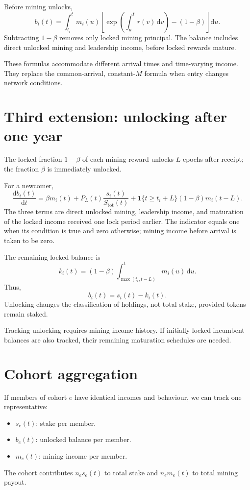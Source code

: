 \documentclass[11pt,a4paper]{article}
\newcommand{\ind}{\mathbf{1}}
\newcommand{\rmd}{\mathrm{d}}
\begin{document}
Before mining unlocks,
\begin{equation}
\boxed{b_i(t)=\int_{t_i}^{t}m_i(u)\left[\exp\!\left(\int_u^t r(v)\,\rmd v\right)-(1-\beta)\right]\rmd u.}
\end{equation}
Subtracting $1-\beta$ removes only locked mining principal. The balance includes direct unlocked mining and leadership income, before locked rewards mature.

These formulas accommodate different arrival times and time-varying income. They replace the common-arrival, constant-$M$ formula when entry changes network conditions.

\section{Third extension: unlocking after one year}
The locked fraction $1-\beta$ of each mining reward unlocks $L$ epochs after receipt; the fraction $\beta$ is immediately unlocked.

For a newcomer,
\begin{equation}
\boxed{\frac{\rmd b_i(t)}{\rmd t}=\beta m_i(t)+P_L(t)\frac{s_i(t)}{S_{\mathrm{tot}}(t)}+\ind\{t\ge t_i+L\}(1-\beta)m_i(t-L).}
\end{equation}
The three terms are direct unlocked mining, leadership income, and maturation of the locked income received one lock period earlier. The indicator equals one when its condition is true and zero otherwise; mining income before arrival is taken to be zero.

The remaining locked balance is
\begin{equation}
\boxed{k_i(t)=(1-\beta)\int_{\max(t_i,t-L)}^t m_i(u)\,\rmd u.}
\end{equation}
Thus,
\begin{equation}
b_i(t)=s_i(t)-k_i(t).
\end{equation}
Unlocking changes the classification of holdings, not total stake, provided tokens remain staked.

Tracking unlocking requires mining-income history. If initially locked incumbent balances are also tracked, their remaining maturation schedules are needed.

\section{Cohort aggregation}
If members of cohort $e$ have identical incomes and behaviour, we can track one representative:
\begin{itemize}
\item $s_e(t)$: stake per member.
\item $b_e(t)$: unlocked balance per member.
\item $m_e(t)$: mining income per member.
\end{itemize}
The cohort contributes $n_es_e(t)$ to total stake and $n_em_e(t)$ to total mining payout.
\end{document}

